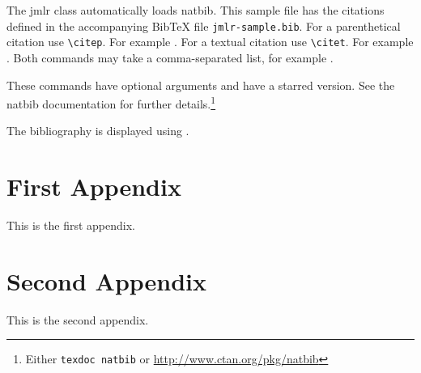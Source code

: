 \documentclass[pmlr]{jmlr}%
\begin{document}
The \textsf{jmlr} class automatically loads \textsf{natbib}.
This sample file has the citations defined in the accompanying
BibTeX file \texttt{jmlr-sample.bib}. For a parenthetical
citation use \verb|\citep|. For example
\citep{guyon-elisseeff-03}. For a textual citation use
\verb|\citet|. For example \citet{guyon2007causalreport}.
Both commands may take a comma-separated list, for example
\citet{guyon-elisseeff-03,guyon2007causalreport}.

These commands have optional arguments and have a starred
version. See the \textsf{natbib} documentation for further
details.\footnote{Either \texttt{texdoc natbib} or
\url{http://www.ctan.org/pkg/natbib}}

The bibliography is displayed using \verb||.




\appendix

\section{First Appendix}\label{apd:first}

This is the first appendix.

\section{Second Appendix}\label{apd:second}

This is the second appendix.
\end{document}
